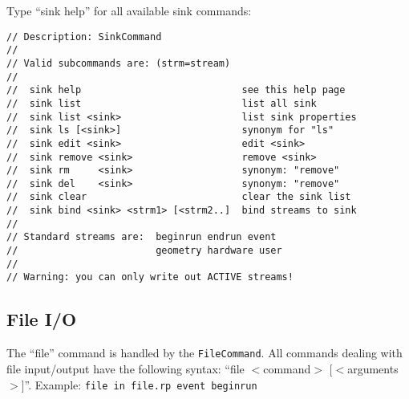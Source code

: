 \documentclass[12pt]{article}
\begin{document}
\medskip
Type ``sink help'' for all available sink commands:
%
\begin{verbatim}
// Description: SinkCommand                                       
//                                                                
// Valid subcommands are: (strm=stream)                           
//                                                                
//  sink help                            see this help page       
//  sink list                            list all sink            
//  sink list <sink>                     list sink properties     
//  sink ls [<sink>]                     synonym for "ls"       
//  sink edit <sink>                     edit <sink>              
//  sink remove <sink>                   remove <sink>            
//  sink rm     <sink>                   synonym: "remove"      
//  sink del    <sink>                   synonym: "remove"      
//  sink clear                           clear the sink list      
//  sink bind <sink> <strm1> [<strm2..]  bind streams to sink     
//                                                                
// Standard streams are:  beginrun endrun event                   
//                        geometry hardware user                  
//                                                                
// Warning: you can only write out ACTIVE streams!                
\end{verbatim}


\subsection{File I/O }
\label{sec:FileCommand}

The ``file'' command is handled by the \texttt{FileCommand}.
All commands dealing with file input/output have the following syntax:
\newline ``file $<$command$>$ [$<$arguments$>$]''. 
\newline Example: \texttt{file in  file.rp event beginrun}
\end{document}

